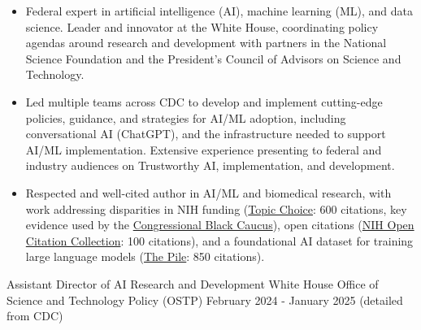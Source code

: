 \documentclass[]{scrartcl}
\begin{document}
\begin{cleanCV}

   \vspace{-1em}

   {
  \vspace{-1.5em}
  \begin{itemize}

  \item Federal expert in artificial intelligence (AI), machine learning (ML), and data science. Leader and innovator at the White House, coordinating policy agendas around research and development with partners in the National Science Foundation and the President's Council of Advisors on Science and Technology.
  \item Led multiple teams across CDC to develop and implement cutting-edge policies, guidance, and strategies for AI/ML adoption, including conversational AI (ChatGPT), and the infrastructure needed to support AI/ML implementation. Extensive experience presenting to federal and industry audiences on Trustworthy AI, implementation, and development.
   \item Respected and well-cited author in AI/ML and biomedical research, with work addressing disparities in NIH funding (\href{https://www.science.org/doi/10.1126/sciadv.aaw7238}{Topic Choice}: 600 citations, key evidence used by the \href{https://github.com/thoppe/personal_cv/blob/6f21f1676ee58b81e557691739578d01d903b341/tex/src/reference_documents/191220_ltr_to_nih_about_grant_disparities.pdf}{Congressional Black Caucus}), open citations (\href{https://www.ncbi.nlm.nih.gov/pmc/articles/PMC6786512/}{NIH Open Citation Collection}: 100 citations), and a foundational AI dataset for training large language models (\href{https://arxiv.org/abs/2101.00027}{The Pile}: 850 citations).

  \end{itemize}
}

  \vspace{0.8em}

\WorkExperience
{}
{Assistant Director of AI Research and Development}
{
  \newline White House Office of Science and Technology Policy (OSTP)
  \newline February 2024 - January 2025 (detailed from CDC)
}
{
  \begin{itemize}


\end{itemize}}
\end{cleanCV}
\end{document}
